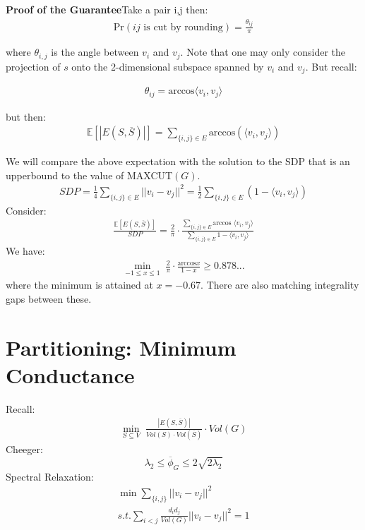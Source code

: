 \documentclass[11pt]{article}
\begin{document}
\textbf{Proof of the Guarantee}Take a pair i,j then:
\begin{align*}
    \text{Pr}\left(ij \text{ is cut by rounding}\right) = \frac{\theta_{ij}}{\pi}
\end{align*}

where $\theta_{i,j}$ is the angle between $v_i$ and $v_j$. Note that one may only consider the projection of $s$ onto the 2-dimensional subspace spanned by $v_i$ and $v_j$. But recall:

\begin{align*}
    \theta_{ij} = \text{arccos}\langle v_i,v_j\rangle
\end{align*}

but then:
\begin{align*}
    \mathbb{E}\left[|E(S,\overline{S})|\right] = \sum_{\{i,j\}\in E} \text{arccos}(\langle v_i,v_j\rangle)
\end{align*}

We will compare the above expectation with the solution to the SDP that is an upperbound to the value of MAXCUT$(G)$.
\begin{align*}
    SDP = \frac{1}{4}\sum_{\{i,j\}\in E} ||v_i - v_j||^2 = \frac{1}{2}\sum_{\{i,j\}\in E}(1 - \langle v_i,v_j\rangle)
\end{align*}
Consider:
\begin{align*}
    \frac{\mathbb{E}\left[E(S,\overline{S})\right]}{SDP} = \frac{2}{\pi} \cdot \frac{\sum_{\{i,j\}\in E}\text{arccos }\langle v_i,v_j\rangle}{\sum_{\{i,j\}\in E}1-\langle v_i,v_j\rangle}
\end{align*}
We have:
\begin{align*}
    \underset{-1\leq x \leq 1}{\min}\;\frac{2}{\pi} \cdot \frac{\text{arccos}x}{1-x} \geq 0.878...
\end{align*}
where the minimum is attained at $x = -0.67$. There are also matching integrality gaps between these.

\section*{Partitioning: Minimum Conductance}
Recall:
\begin{align*}
    \underset{S \subseteq V}{\min}\; \frac{|E( S,\overline{S})|}{Vol(S)\cdot Vol(\overline{S})}\cdot Vol(G)
\end{align*}
Cheeger:
\[
    \lambda_2 \leq \overline{\phi}_G \leq 2\sqrt{2\lambda_2}
\]
Spectral Relaxation:
\begin{align*}
    \min \sum_{\{i,j\}} || v_i - v_j||^2\\
    s.t. \sum_{i < j} \frac{d_i d_j}{Vol(G)}||v_i - v_j||^2 = 1
\end{align*}
\end{document}
